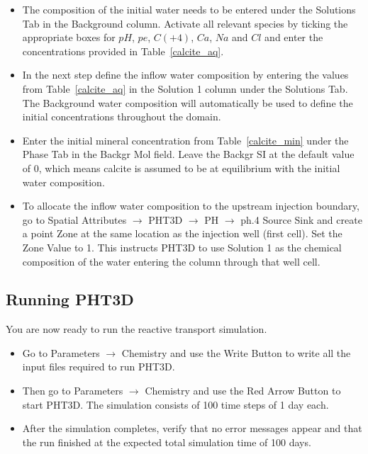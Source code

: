 \begin{itemize}

\item The composition of the initial water needs to be entered under
the {\color{blue}Solutions} Tab in the {\color{blue}Background} column.
Activate all relevant species by ticking the appropriate boxes for
$pH$, $pe$, $C(+4)$, $Ca$, $Na$ and $Cl$
and enter the concentrations provided in Table~\ref{calcite_aq}.

\item In the next step define the inflow water composition by entering
the values from Table~\ref{calcite_aq} in the
{\color{blue}Solution 1} column under the {\color{blue}Solutions} Tab.
The {\color{blue}Background} water composition will automatically be
used to define the initial concentrations throughout the domain.

\item Enter the initial mineral concentration from Table~\ref{calcite_min}
under the {\color{blue}Phase} Tab in the {\color{blue}Backgr Mol} field.
Leave the {\color{blue}Backgr SI} at the default value of 0,
which means calcite is assumed to be at equilibrium with the initial
water composition.

\item To allocate the inflow water composition to the upstream injection
boundary, go to
{\color{blue}Spatial Attributes} $\rightarrow$
{\color{blue}PHT3D} $\rightarrow$
{\color{blue}PH} $\rightarrow$
{\color{blue}ph.4 Source Sink}
and create a point Zone at the same location as the injection well
(first cell).
Set the {\color{blue}Zone Value} to 1.
This instructs PHT3D to use {\color{blue}Solution 1} as the chemical
composition of the water entering the column through that well cell.

\end{itemize}

\subsection[Running PHT3D]{Running PHT3D}

You are now ready to run the reactive transport simulation.

\begin{itemize}

\item Go to {\color{blue}Parameters} $\rightarrow$
{\color{blue}Chemistry} and use the {\color{blue}Write Button} to write
all the input files required to run PHT3D.

\item Then go to {\color{blue}Parameters} $\rightarrow$
{\color{blue}Chemistry} and use the {\color{blue}Red Arrow Button} to
start PHT3D.
The simulation consists of 100 time steps of 1 day each.

\item After the simulation completes, verify that no error messages
appear and that the run finished at the expected total simulation
time of 100 days.

\end{itemize}

